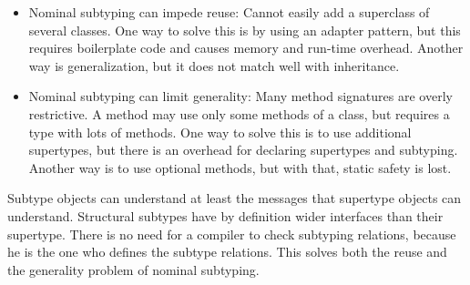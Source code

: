 \begin{mytitle} \hfill
\begin{itemize}
    \item Nominal subtyping can impede reuse: Cannot easily add a superclass of several classes. One way to solve this is by using an adapter pattern, but this requires boilerplate code and causes memory and run-time overhead. Another way is generalization, but it does not match well with inheritance.
    \item Nominal subtyping can limit generality: Many method signatures are overly restrictive. A method may use only some methods of a class, but requires a type with lots of methods. One way to solve this is to use additional supertypes, but there is an overhead for declaring supertypes and subtyping. Another way is to use optional methods, but with that, static safety is lost.
\end{itemize}
\end{mytitle}
\begin{mytitle} Subtype objects can understand at least the messages that supertype objects can understand. Structural subtypes have by definition wider interfaces than their supertype. There is no need for a compiler to check subtyping relations, because he is the one who defines the subtype relations. This solves both the reuse and the generality problem of nominal subtyping. 
\end{mytitle}

